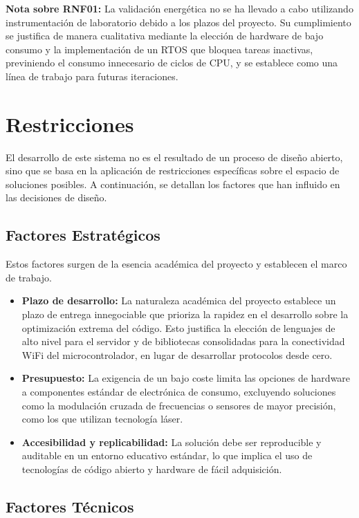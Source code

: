 \textbf{Nota sobre RNF01:} La validación energética no se ha llevado a cabo utilizando instrumentación de laboratorio debido a los plazos del proyecto. Su cumplimiento se justifica de manera cualitativa mediante la elección de hardware de bajo consumo y la implementación de un RTOS que bloquea tareas inactivas, previniendo el consumo innecesario de ciclos de CPU, y se establece como una línea de trabajo para futuras iteraciones.

\section{Restricciones}

El desarrollo de este sistema no es el resultado de un proceso de diseño abierto, sino que se basa en la aplicación de restricciones específicas sobre el espacio de soluciones posibles. A continuación, se detallan los factores que han influido en las decisiones de diseño.

\subsection{Factores Estratégicos}

Estos factores surgen de la esencia académica del proyecto y establecen el marco de trabajo.

\begin{itemize}
    \item \textbf{Plazo de desarrollo:} La naturaleza académica del proyecto establece un plazo de entrega innegociable que prioriza la rapidez en el desarrollo sobre la optimización extrema del código. Esto justifica la elección de lenguajes de alto nivel para el servidor y de bibliotecas consolidadas para la conectividad WiFi del microcontrolador, en lugar de desarrollar protocolos desde cero.
    \item \textbf{Presupuesto:} La exigencia de un bajo coste limita las opciones de hardware a componentes estándar de electrónica de consumo, excluyendo soluciones como la modulación cruzada de frecuencias o sensores de mayor precisión, como los que utilizan tecnología láser.
    \item \textbf{Accesibilidad y replicabilidad:} La solución debe ser reproducible y auditable en un entorno educativo estándar, lo que implica el uso de tecnologías de código abierto y hardware de fácil adquisición.
\end{itemize}

\subsection{Factores Técnicos}


